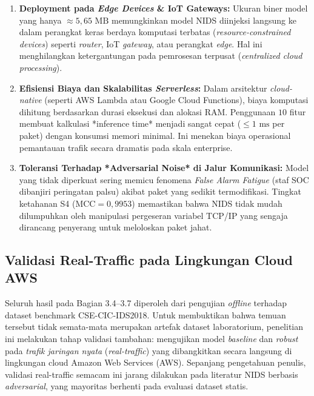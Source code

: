 \documentclass[11pt, a4paper]{article}
\begin{document}
\begin{enumerate}
    \item \textbf{Deployment pada \textit{Edge Devices} & IoT Gateways:}
    Ukuran biner model yang hanya $\approx 5{,}65\text{ MB}$ memungkinkan model NIDS diinjeksi langsung ke dalam perangkat keras berdaya komputasi terbatas (\textit{resource-constrained devices}) seperti \textit{router}, IoT \textit{gateway}, atau perangkat \textit{edge}. Hal ini menghilangkan ketergantungan pada pemrosesan terpusat (\textit{centralized cloud processing}).

    \item \textbf{Efisiensi Biaya dan Skalabilitas \textit{Serverless}:}
    Dalam arsitektur \textit{cloud-native} (seperti AWS Lambda atau Google Cloud Functions), biaya komputasi dihitung berdasarkan durasi eksekusi dan alokasi RAM. Penggunaan $10$ fitur membuat kalkulasi *inference time* menjadi sangat cepat ($\le 1\text{ ms}$ per paket) dengan konsumsi memori minimal. Ini menekan biaya operasional pemantauan trafik secara dramatis pada skala enterprise.

    \item \textbf{Toleransi Terhadap *Adversarial Noise* di Jalur Komunikasi:}
    Model yang tidak diperkuat sering memicu fenomena \textit{False Alarm Fatigue} (staf SOC dibanjiri peringatan palsu) akibat paket yang sedikit termodifikasi. Tingkat ketahanan S4 ($\text{MCC} = 0{,}9953$) memastikan bahwa NIDS tidak mudah dilumpuhkan oleh manipulasi pergeseran variabel TCP/IP yang sengaja dirancang penyerang untuk meloloskan paket jahat.
\end{enumerate}


\subsection{Validasi Real-Traffic pada Lingkungan Cloud AWS}
\label{sec:real_traffic}
Seluruh hasil pada Bagian 3.4--3.7 diperoleh dari pengujian \textit{offline} terhadap dataset benchmark CSE-CIC-IDS2018. Untuk membuktikan bahwa temuan tersebut tidak semata-mata merupakan artefak dataset laboratorium, penelitian ini melakukan tahap validasi tambahan: mengujikan model \textit{baseline} dan \textit{robust} pada \textit{trafik jaringan nyata} (\textit{real-traffic}) yang dibangkitkan secara langsung di lingkungan cloud Amazon Web Services (AWS). Sepanjang pengetahuan penulis, validasi real-traffic semacam ini jarang dilakukan pada literatur NIDS berbasis \textit{adversarial}, yang mayoritas berhenti pada evaluasi dataset statis.
\end{document}
